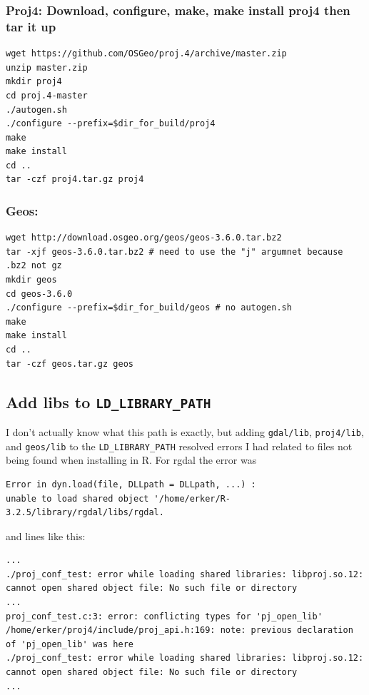 \documentclass{article}
\begin{document}
\subsubsection*{Proj4: Download, configure, make, make install proj4 then tar it up}
\label{sec:org8ba475d}
\begin{verbatim}
wget https://github.com/OSGeo/proj.4/archive/master.zip
unzip master.zip
mkdir proj4
cd proj.4-master
./autogen.sh
./configure --prefix=$dir_for_build/proj4
make
make install
cd ..
tar -czf proj4.tar.gz proj4
\end{verbatim}

\subsubsection*{Geos:}
\label{sec:org48e8e5e}
\begin{verbatim}
wget http://download.osgeo.org/geos/geos-3.6.0.tar.bz2
tar -xjf geos-3.6.0.tar.bz2 # need to use the "j" argumnet because .bz2 not gz
mkdir geos
cd geos-3.6.0
./configure --prefix=$dir_for_build/geos # no autogen.sh
make
make install
cd ..
tar -czf geos.tar.gz geos

\end{verbatim}

\subsection*{Add libs to \texttt{LD\_LIBRARY\_PATH}}
\label{sec:org0579e20}
I don't actually know what this path is exactly, but adding \texttt{gdal/lib},
\texttt{proj4/lib}, and \texttt{geos/lib} to the \texttt{LD\_LIBRARY\_PATH} resolved errors I had
related to files not being found when installing in R.  For rgdal the error was
\begin{verbatim}
Error in dyn.load(file, DLLpath = DLLpath, ...) :
unable to load shared object '/home/erker/R-3.2.5/library/rgdal/libs/rgdal.
\end{verbatim}

and lines like this:
\begin{verbatim}
...
./proj_conf_test: error while loading shared libraries: libproj.so.12: cannot open shared object file: No such file or directory
...
proj_conf_test.c:3: error: conflicting types for 'pj_open_lib'
/home/erker/proj4/include/proj_api.h:169: note: previous declaration of 'pj_open_lib' was here
./proj_conf_test: error while loading shared libraries: libproj.so.12: cannot open shared object file: No such file or directory
...
\end{verbatim}
\end{document}

